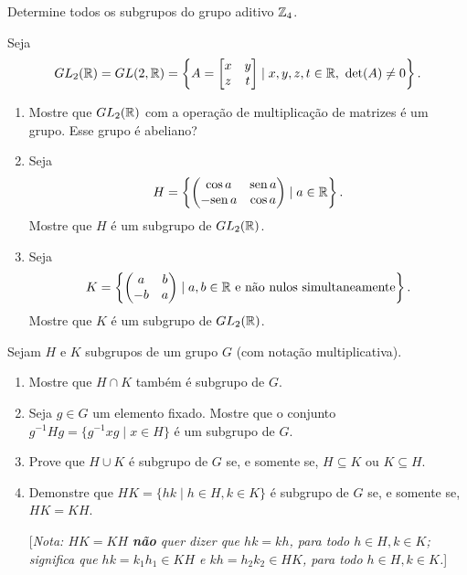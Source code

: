 \documentclass[12pt]{exam}
\begin{document}
    \vspace{.3cm}

    \questao{} Determine todos os subgrupos do grupo aditivo $\mathbb{Z}_4$.

    \vspace{.3cm}

    \questao{} Seja
    \[
    GL_2(\mathbb{R}) = GL(2, \mathbb{R}) = \left\{A = \begin{bmatrix}x & y\\z & t\end{bmatrix} \mid x, y, z, t \in \mathbb{R},\ \det(A) \ne 0 \right\}.
    \]
    \begin{enumerate}[label=({\alph*})]
        \item Mostre que $GL_2(\mathbb{R})$ com a operação de multiplicação de matrizes é um grupo. Esse grupo é abeliano?

        \item Seja
        \[
        H = \left\{ \begin{pmatrix}
            \cos a & {\rm sen\,} a\\ - {\rm sen\,} a & \cos a
        \end{pmatrix} \mid a \in \mathbb{R}\right\}.
        \]
        Mostre que $H$ é um subgrupo de $GL_2(\mathbb{R})$.

        \item Seja
        \[
        K = \left\{ \begin{pmatrix}
            a & b\\ -b & a
        \end{pmatrix} \mid a, b \in \mathbb{R} \mbox{ e não nulos simultaneamente}\right\}.
        \]
        Mostre que $K$ é um subgrupo de $GL_2(\mathbb{R})$.
    \end{enumerate}

    \questao{} Sejam $H$ e $K$ subgrupos de um grupo $G$ (com notação
    multiplicativa).
    \begin{enumerate}[label=({\alph*})]
        \item Mostre que $H\cap K$ também é subgrupo de $G$.

        \item Seja $g\in G$ um elemento fixado. Mostre que o conjunto
        $g^{-1}Hg=\{ g^{-1}xg \mid x\in H \} $ é um subgrupo de $G$.

        \item Prove que $H\cup K$ é subgrupo de $G$ se, e somente se,
        $H\subseteq K$ ou $K\subseteq H$.

        \item Demonstre que $HK=\{hk \mid h\in H, k\in K\}$ é subgrupo
        de $G$ se, e somente se, $HK=KH$.

        [\emph{Nota: $HK=KH$ \textbf{não} quer dizer que $hk=kh$,
            para todo $h\in H, k\in K$; significa que $hk=k_1h_1 \in KH$ e $kh=h_2k_2 \in
            HK$, para todo $h\in H, k\in K$.}]
    \end{enumerate}
\end{document}

